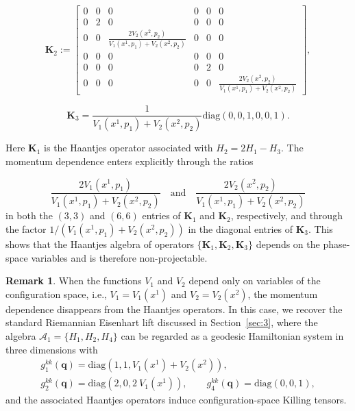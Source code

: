 \documentclass[10pt]{amsart}
\numberwithin{equation}{section}
\newcommand{\bs}{\boldsymbol}
\theoremstyle{definition}
\newtheorem{remark}{\textbf{Remark}}
\begin{document}
	\begin{equation}\label{K2 cart mom}
		\bs{K}_2:=\left[\begin{array}{cccccc}
			0 & 0 & 0 & 0 & 0 & 0 \\
			0 & 2 & 0 & 0 & 0 & 0 \\
			0 & 0 & \frac{2 V_2(x^2, p_2)}{V_1(x^1, p_1)+V_2(x^2, p_2)} & 0 & 0 &0\\
			0 & 0 & 0 & 0 & 0 & 0 \\
			0 & 0 & 0 & 0 & 2 & 0 \\
			0 & 0 & 0 & 0 & 0 & \frac{2 V_2(x^2, p_2)}{V_1(x^1, p_1)+V_2(x^2, p_2)}
		\end{array}\right],
	\end{equation}
	
	\begin{equation}
		\bs{K}_3=\frac{1}{V_1(x^1, p_1)+V_2(x^2, p_2)}\mathrm{diag}(0,0,1,0,0,1).
	\end{equation} 
	
Here $\bs{K}_1$ is the Haantjes operator associated with $H_2=2H_1-H_3$. The momentum dependence enters explicitly through the ratios
	
	$$\frac{2V_1(x^1, p_1)}{V_1(x^1, p_1)+V_2(x^2, p_2)} \quad \text{and} \quad \frac{2V_2(x^2, p_2)}{V_1(x^1, p_1)+V_2(x^2, p_2)}$$
	in both the $(3,3)$ and $(6,6)$ entries of $\bs{K}_1$ and $\bs{K}_2$, respectively, and through the factor $1/(V_1(x^1, p_1)+V_2(x^2, p_2))$ in the diagonal entries of $\bs{K}_3$. This shows that the Haantjes algebra of operators $\{\bs{K}_1, \bs{K}_2, \bs{K}_3\}$ depends on the phase-space variables and is therefore non-projectable.
	
	\begin{remark} When the functions $V_1$ and $V_2$ depend only on variables of the configuration space, i.e., $V_1 = V_1(x^1)$ and $V_2 = V_2(x^2)$, the momentum dependence disappears from the Haantjes operators. In this case, we recover the standard Riemannian Eisenhart lift discussed in Section~\ref{sec:3}, where the algebra $\mathcal{A}_1=\{H_1,H_2, H_4 \}$ can be regarded as a geodesic Hamiltonian system in three dimensions with 
		\begin{gather}
		g_1^{kk}(\bs{q})= \mathrm{diag}(1,1, V_1(x^1)+V_2(x^2)),\\
		g_2^{kk}(\bs{q})= \mathrm{diag}(2,0, 2~V_1(x^1)), \qquad 
		g_4^{kk}(\bs{q})= \mathrm{diag}(0,0, 1),
	\end{gather}
	and the associated Haantjes operators induce configuration-space Killing tensors.
\end{remark}
\end{document}

